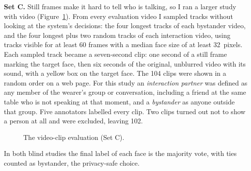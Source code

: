 \textbf{Set C.} Still frames make it hard to tell who is talking, so I ran a larger study
with video (Figure~\ref{fig:clipstudy}). From every evaluation video I sampled tracks
without looking at the system's decisions: the four longest tracks of each bystander
video, and the four longest plus two random tracks of each interaction video, using tracks
visible for at least 60 frames with a median face size of at least 32~pixels. Each sampled
track became a seven-second clip: one second of a still frame marking the target face,
then six seconds of the original, unblurred video with its sound, with a yellow box on the
target face. The 104 clips were shown in a random order on a web page. For this study an
\emph{interaction partner} was defined as any member of the wearer's group or
conversation, including a friend at the same table who is not speaking at that moment,
and a \emph{bystander} as anyone outside that group. Five annotators labelled every clip.
Two clips turned out not to show a person at all and were excluded, leaving 102.

\begin{figure}[htbp]
\centering
{}
\caption{The video-clip evaluation (Set C).}
\label{fig:clipstudy}
\end{figure}

In both blind studies the final label of each face is the majority vote, with ties counted
as bystander, the privacy-safe choice.


